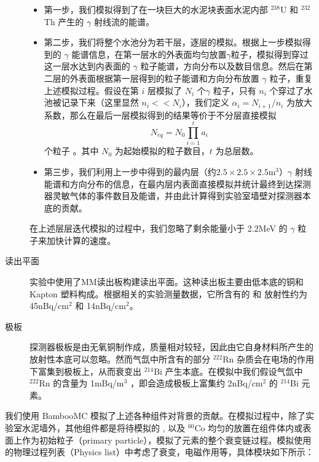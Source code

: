 \begin{description}
    \begin{itemize}
        \item 第一步，我们模拟得到了在一块巨大的水泥块表面水泥内部 $^{238}$U 和 $^{232}$Th 产生的 $\gamma$ 射线流的能谱。
        \item 第二步，我们将整个水池分为若干层，逐层的模拟。根据上一步模拟得到的 $\gamma$ 能谱信息，在第一层水的外表面均匀放置$\gamma$粒子，模拟得到穿过这一层水达到内表面的 $\gamma$ 粒子能谱，方向分布以及数目信息。然后在第二层的外表面根据第一层得到的粒子能谱和方向分布放置 $\gamma$ 粒子，重复上述模拟过程。假设在第 $i$ 层模拟了 $N_i$ 个$\gamma$ 粒子，只有 $n_i$ 个穿过了水池被记录下来（这里显然 $n_i<<N_i$），我们定义 $\alpha_i=N_{i+1}/n_i$ 为放大系数，那么在最后一层模拟得到的结果等价于不分层直接模拟 $$N_{eq}=N_0\prod_{i=1}^{t}a_i$$ 个粒子 。其中 $N_0$ 为起始模拟的粒子数目，$t$ 为总层数。
        \item 第三步，我们利用上一步中得到的最内层（约$2.5\times2.5\times2.5$m$^3$）$\gamma$ 射线能谱和方向分布的信息，在最内层内表面直接模拟并统计最终到达探测器灵敏气体的事件数目及能谱，并由此计算得到实验室墙壁对探测器本底的贡献。
    \end{itemize}
    在上述层层迭代模拟的过程中，我们忽略了剩余能量小于 2.2MeV 的 $\gamma$ 粒子来加快计算的速度。

    \item[读出平面] 实验中使用了MM读出板构建读出平面。这种读出板主要由低本底的铜和 Kapton 塑料构成。根据相关的实验测量数据，它所含有的 \utte 和 \thttt 放射性约为 45nBq/cm$^2$ 和 14nBq/cm$^2$。

    \item[极板] 探测器极板是由无氧铜制作成，质量相对较轻，因此由它自身材料所产生的放射性本底可以忽略。然而气氙中所含有的部分 $^{222}$Rn 杂质会在电场的作用下富集到极板上，从而衰变出 $^{214}$Bi 产生本底。在模拟中我们假设气氙中 $^{222}$Rn 的含量为 1mBq/m$^3$ ，即会造成极板上富集约 2nBq/cm$^2$ 的 $^{214}$Bi 元素。
\end{description}

\vspace{0.4cm}

我们使用 BambooMC 模拟了上述各种组件对背景的贡献。在模拟过程中，除了实验室水泥墙外，其他组件都是将待模拟的 \utte, \thttt 以及 $^{60}$Co 均匀的放置在组件体内或表面上作为初始粒子（primary particle），模拟了元素的整个衰变链过程。模拟使用的物理过程列表（Physics list）中考虑了衰变，电磁作用等，具体模块如下所示：

